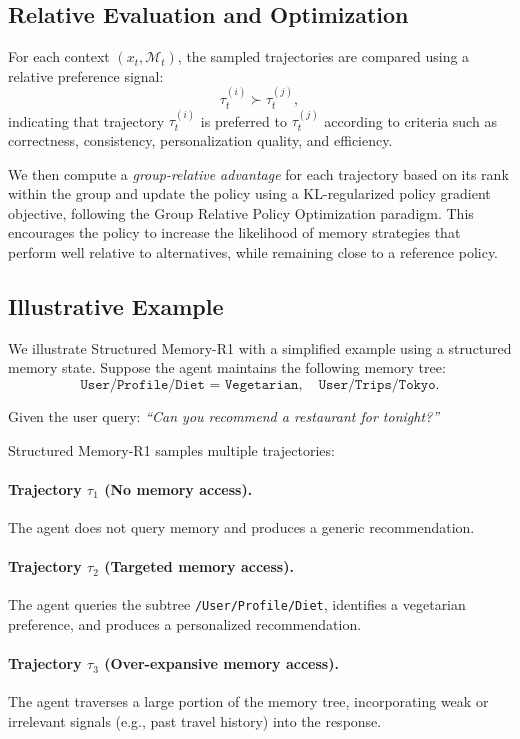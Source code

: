 \documentclass{article}
\begin{document}
\subsection{Relative Evaluation and Optimization}

For each context $(x_t, \mathcal{M}_t)$, the sampled trajectories are compared using a relative preference signal:
\[
\tau_t^{(i)} \succ \tau_t^{(j)},
\]
indicating that trajectory $\tau_t^{(i)}$ is preferred to $\tau_t^{(j)}$ according to criteria such as correctness, consistency, personalization quality, and efficiency.

We then compute a \emph{group-relative advantage} for each trajectory based on its rank within the group and update the policy using a KL-regularized policy gradient objective, following the Group Relative Policy Optimization paradigm. This encourages the policy to increase the likelihood of memory strategies that perform well relative to alternatives, while remaining close to a reference policy.

\subsection{Illustrative Example}

We illustrate Structured Memory-R1 with a simplified example using a structured memory state. Suppose the agent maintains the following memory tree:
\[
\texttt{User/Profile/Diet = Vegetarian}, \quad
\texttt{User/Trips/Tokyo}.
\]

Given the user query:
\emph{``Can you recommend a restaurant for tonight?''}

Structured Memory-R1 samples multiple trajectories:

\paragraph{Trajectory $\tau_1$ (No memory access).}
The agent does not query memory and produces a generic recommendation.

\paragraph{Trajectory $\tau_2$ (Targeted memory access).}
The agent queries the subtree \texttt{/User/Profile/Diet}, identifies a vegetarian preference, and produces a personalized recommendation.

\paragraph{Trajectory $\tau_3$ (Over-expansive memory access).}
The agent traverses a large portion of the memory tree, incorporating weak or irrelevant signals (e.g., past travel history) into the response.
\end{document}
